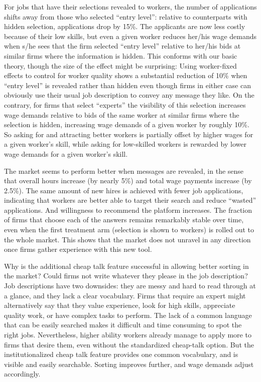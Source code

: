 \documentclass[12pt]{article}
\begin{document}
 For jobs that have their selections revealed to workers, the number of applications shifts away from those who selected ``entry level'': relative to counterparts with hidden selection, applications drop by 15\%. The applicants are now less costly because of their low skills, but even a given worker reduces her/his wage demands when s/he sees that the firm selected ``entry level'' relative to her/his bids at similar firms where the information is hidden. This conforms with our basic theory, though the size of the effect might be surprising: Using worker-fixed effects to control for worker quality shows a substantial reduction of 10\% when ``entry level'' is revealed rather than hidden even though firms in either case can obviously use their usual job description to convey any message they like. On the contrary, for firms that select ``experts'' the visibility of this selection increases wage demands relative to bids of the same worker at similar firms where the selection is hidden, increasing wage demands of a given worker by roughly 10\%. So asking for and attracting better workers is partially offset by higher wages for a given worker's skill, while asking for low-skilled workers is rewarded by lower wage demands for a given worker's skill.  
 
 The market seems to perform better when messages are revealed, in the sense that overall hours increase (by nearly 5\%) and total wage payments increase (by 2.5\%). The same amount of new hires is achieved with fewer job applications, indicating that workers are better able to target their search and reduce ``wasted'' applications. And willingness to recommend the platform increases. The fraction of firms that choose each of the answers remains remarkably stable over time, even when the first treatment arm (selection is shown to workers) is rolled out to the whole market. This shows that the market does not unravel in any direction once firms gather experience with this new tool. 

Why is the additional cheap talk feature successful in allowing better sorting in the market? Could firms not write whatever they please in the job description? Job descriptions have two downsides: they are messy and hard to read through at a glance, and they lack a clear vocabulary. Firms that require an expert might alternatively say that they value experience, look for high skills, appreciate quality work, or have complex tasks to perform. The lack of a common language that can be easily searched makes it difficult and time consuming to spot the right jobs. Nevertheless, higher ability workers already manage to apply more to firms that desire them, even without the standardized cheap-talk option. But the institutionalized cheap talk feature provides one common vocabulary, and is visible and easily searchable. Sorting improves further, and wage demands adjust accordingly. 
\end{document}
